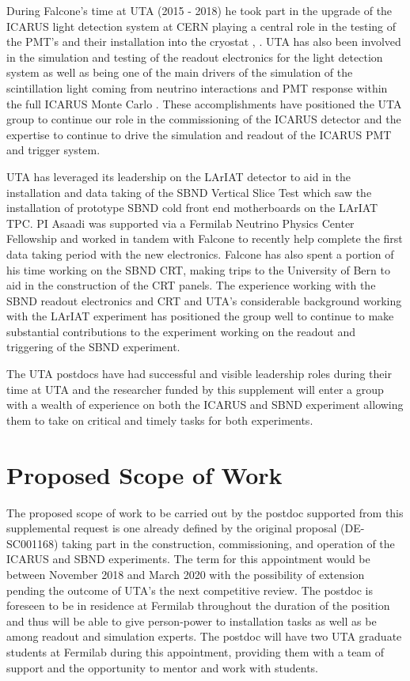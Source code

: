 During Falcone's time at UTA (2015 - 2018) he took part in the upgrade of the ICARUS light detection system at CERN playing a central role in the testing of the PMT's and their installation into the cryostat \cite{Babicz:2018svg}, \cite{Bonesini:2018ubd}. UTA has also been involved in the simulation and testing of the readout electronics for the light detection system \cite{Bagby:2018fkj} as well as being one of the main drivers of the simulation of the scintillation light coming from neutrino interactions and PMT response within the full ICARUS Monte Carlo \cite{JPhys}. These accomplishments have positioned the UTA group to continue our role in the commissioning of the ICARUS detector and the expertise to continue to drive the simulation and readout of the ICARUS PMT and trigger system.

UTA has leveraged its leadership on the LArIAT detector to aid in the installation and data taking of the SBND Vertical Slice Test which saw the installation of prototype SBND cold front end motherboards on the LArIAT TPC. PI Asaadi was supported via a Fermilab Neutrino Physics Center Fellowship and worked in tandem with Falcone to recently help complete the first data taking period with the new electronics. Falcone has also spent a portion of his time working on the SBND CRT, making trips to the University of Bern to aid in the construction of the CRT panels. The experience working with the SBND readout electronics and CRT and UTA's considerable background working with the LArIAT experiment has positioned the group well to continue to make substantial contributions to the experiment working on the readout and triggering of the SBND experiment.

The UTA postdocs have had successful and visible leadership roles during their time at UTA and the researcher funded by this supplement will enter a group with a wealth of experience on both the ICARUS and SBND experiment allowing them to take on critical and timely tasks for both experiments.

  
\section*{Proposed Scope of Work}
The proposed scope of work to be carried out by the postdoc supported from this supplemental request is one already defined by the original proposal (DE-SC001168)  taking part in the construction, commissioning, and operation of the ICARUS and SBND experiments. The term for this appointment would be between November 2018 and March 2020 with the possibility of extension pending the outcome of UTA's the next competitive review. The postdoc is foreseen to be in residence at Fermilab throughout the duration of the position and thus will be able to give person-power to installation tasks as well as be among readout and simulation experts. The postdoc will have two UTA graduate students at Fermilab during this appointment, providing them with a team of support and the opportunity to mentor and work with students.

